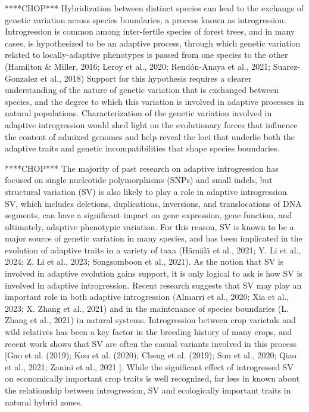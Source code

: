 \documentclass[
]{agujournal2019}
\begin{document}
****CHOP*** Hybridization between distinct species can lead to the
exchange of genetic variation across species boundaries, a process known
as introgression. Introgression is common among inter-fertile species of
forest trees, and in many cases, is hypothesized to be an adaptive
process, through which genetic variation related to locally-adaptive
phenotypes is passed from one species to the other (Hamilton \& Miller,
2016; Leroy et al., 2020; Rendón-Anaya et al., 2021; Suarez-Gonzalez et
al., 2018) Support for this hypothesis requires a clearer understanding
of the nature of genetic variation that is exchanged between species,
and the degree to which this variation is involved in adaptive processes
in natural populations. Characterization of the genetic variation
involved in adaptive introgression would shed light on the evolutionary
forces that influence the content of admixed genomes and help reveal the
loci that underlie both the adaptive traits and genetic
incompatibilities that shape species boundaries.

****CHOP*** The majority of past research on adaptive introgression has
focused on single nucleotide polymorphisms (SNPs) and small indels, but
structural variation (SV) is also likely to play a role in adaptive
introgression. SV, which includes deletions, duplications, inversions,
and translocations of DNA segments, can have a significant impact on
gene expression, gene function, and ultimately, adaptive phenotypic
variation. For this reason, SV is known to be a major source of genetic
variation in many species, and has been implicated in the evolution of
adaptive traits in a variety of taxa (Hämälä et al., 2021; Y. Li et al.,
2024; Z. Li et al., 2023; Songsomboon et al., 2021). As the notion that
SV is involved in adaptive evolution gains support, it is only logical
to ask is how SV is involved in adaptive introgression. Recent research
suggests that SV may play an important role in both adaptive
introgression (Almarri et al., 2020; Xia et al., 2023; X. Zhang et al.,
2021) and in the maintenance of species boundaries (L. Zhang et al.,
2021) in natural systems. Introgression between crop varietals and wild
relatives has been a key factor in the breeding history of many crops,
and recent work shows that SV are often the casual variants involved in
this process {[}Gao et al. (2019); Kou et al. (2020); Cheng et al.
(2019); Sun et al., 2020; Qiao et al., 2021; Zanini et al., 2021 {]}.
While the significant effect of introgressed SV on economically
important crop traits is well recognized, far less in known about the
relationship between introgression, SV and ecologically important traits
in natural hybrid zones.
\end{document}
